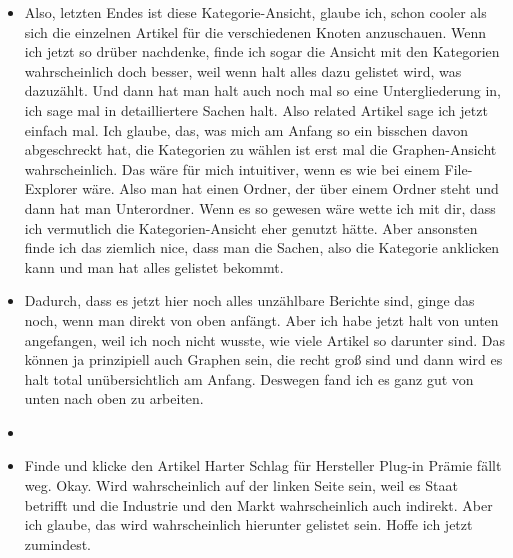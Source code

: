 {\begin{itemize}[]
                  Also, dass du beschrieben hast, dass du eher diese Bottom-to-Top Ansicht bevorzugst, also, dass du eher auf die Artikel klickst.
                  Später hast du dann aber auch die Top to Bottom Ansicht ausprobiert.
                  Kannst du mir dazu vielleicht noch etwas erzählen?
            \item {} Also, letzten Endes ist diese Kategorie-Ansicht, glaube ich, schon cooler als sich die einzelnen Artikel für die verschiedenen Knoten anzuschauen.
                  Wenn ich jetzt so drüber nachdenke, finde ich sogar die Ansicht mit den Kategorien wahrscheinlich doch besser, weil wenn halt alles dazu gelistet wird, was dazuzählt.
                  Und dann hat man halt auch noch mal so eine Untergliederung in, ich sage mal in detailliertere Sachen halt. Also related Artikel sage ich jetzt einfach mal.
                  Ich glaube, das, was mich am Anfang so ein bisschen davon abgeschreckt hat, die Kategorien zu wählen ist erst mal die Graphen-Ansicht wahrscheinlich.
                  Das wäre für mich intuitiver, wenn es wie bei einem File-Explorer wäre.
                  Also man hat einen Ordner, der über einem Ordner steht und dann hat man Unterordner.
                  Wenn es so gewesen wäre wette ich mit dir, dass ich vermutlich die Kategorien-Ansicht eher genutzt hätte.
                  Aber ansonsten finde ich das ziemlich nice, dass man die Sachen, also die Kategorie anklicken kann und man hat alles gelistet bekommt.
            \item {} Dadurch, dass es jetzt hier noch alles unzählbare Berichte sind, ginge das noch, wenn man direkt von oben anfängt.
                  Aber ich habe jetzt halt von unten angefangen, weil ich noch nicht wusste, wie viele Artikel so darunter sind.
                  Das können ja prinzipiell auch Graphen sein, die recht groß sind und dann wird es halt total unübersichtlich am Anfang.
                  Deswegen fand ich es ganz gut von unten nach oben zu arbeiten.
            \item {}
            \item {} Finde und klicke den Artikel \flqq Harter Schlag für Hersteller Plug-in Prämie fällt weg\frqq{}.
                  Okay. Wird wahrscheinlich auf der linken Seite sein, weil es Staat betrifft und die Industrie und den Markt wahrscheinlich auch indirekt.
                  Aber ich glaube, das wird wahrscheinlich hierunter gelistet sein.
                  Hoffe ich jetzt zumindest.

\end{itemize}}

